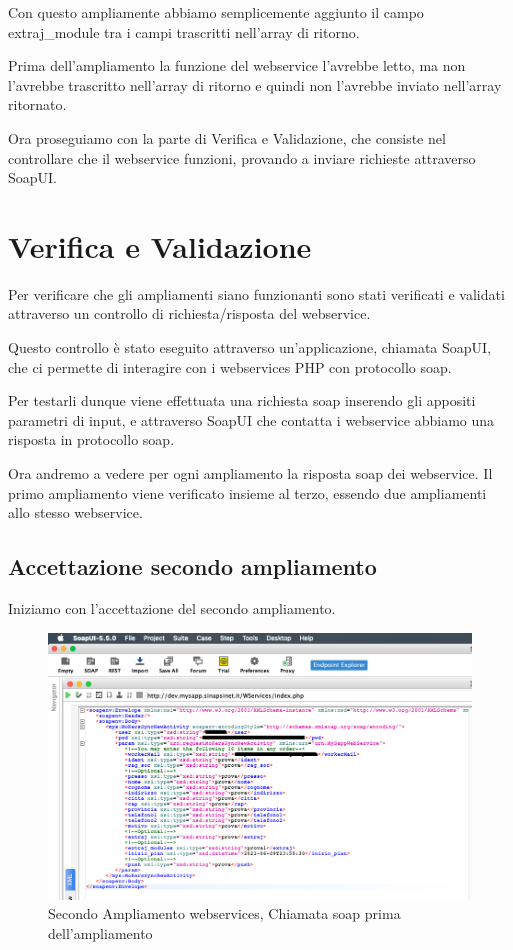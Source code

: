 	Con questo ampliamente abbiamo semplicemente aggiunto il campo extraj\_module tra i campi trascritti nell'array di ritorno.
	
	Prima dell'ampliamento la funzione del webservice l'avrebbe letto, ma non l'avrebbe trascritto nell'array di ritorno e quindi non l'avrebbe inviato nell'array ritornato.
	\newspace
	
	Ora proseguiamo con la parte di Verifica e Validazione, che consiste nel controllare che il webservice funzioni, provando a inviare richieste attraverso SoapUI.

\newspace

\newpage

\section{Verifica e Validazione}

	Per verificare che gli ampliamenti siano funzionanti sono stati verificati e validati attraverso un controllo di richiesta/risposta del webservice.
	\newspace
	
	Questo controllo è stato eseguito attraverso un'applicazione, chiamata SoapUI, che ci permette di interagire con i webservices PHP con protocollo \gls{soap}.
	
	Per testarli dunque viene effettuata una richiesta \gls{soap} inserendo gli appositi parametri di input, e attraverso SoapUI che contatta i webservice abbiamo una risposta in protocollo \gls{soap}.
	\newspace
	
	Ora andremo a vedere per ogni ampliamento la risposta \gls{soap} dei webservice.
	Il primo ampliamento viene verificato insieme al terzo, essendo due ampliamenti allo stesso webservice.

\newpage

\subsection{Accettazione secondo ampliamento}
Iniziamo con l'accettazione del secondo ampliamento.

\begin{figure}[!h] 
	\centering
	\includegraphics[scale = 0.5]{immagini/webservices/ampliamenti/accettazione/2ampl_soap_chiamata_premodifica.png}
	\caption{Secondo Ampliamento webservices, Chiamata  \gls{soap} prima dell'ampliamento}
	\label{fig:5-10}
\end{figure}

